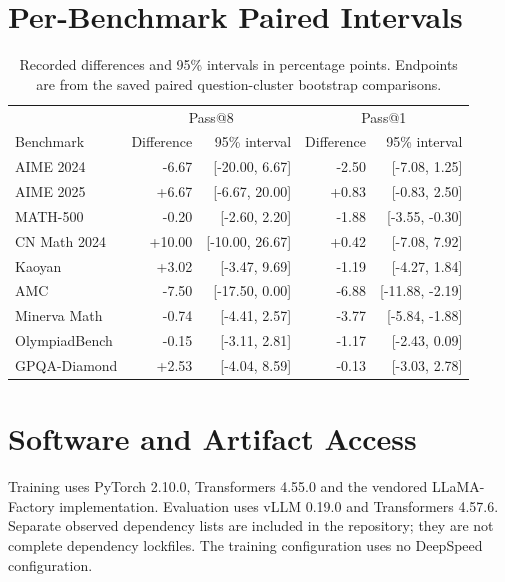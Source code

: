 \documentclass[11pt,letterpaper]{article}
\begin{document}
\appendix
\section{Per-Benchmark Paired Intervals}
\begin{table}[H]\centering\small
\caption{Recorded differences and 95\% intervals in percentage points. Endpoints are from the saved paired question-cluster bootstrap comparisons.}\label{tab:intervals}
\begin{tabular}{lrrrr}\toprule
 & \multicolumn{2}{c}{Pass@8} & \multicolumn{2}{c}{Pass@1}\\
Benchmark & Difference & 95\% interval & Difference & 95\% interval\\\midrule
AIME 2024 & -6.67 & [-20.00, 6.67] & -2.50 & [-7.08, 1.25] \\
AIME 2025 & +6.67 & [-6.67, 20.00] & +0.83 & [-0.83, 2.50] \\
MATH-500 & -0.20 & [-2.60, 2.20] & -1.88 & [-3.55, -0.30] \\
CN Math 2024 & +10.00 & [-10.00, 26.67] & +0.42 & [-7.08, 7.92] \\
Kaoyan & +3.02 & [-3.47, 9.69] & -1.19 & [-4.27, 1.84] \\
AMC & -7.50 & [-17.50, 0.00] & -6.88 & [-11.88, -2.19] \\
Minerva Math & -0.74 & [-4.41, 2.57] & -3.77 & [-5.84, -1.88] \\
OlympiadBench & -0.15 & [-3.11, 2.81] & -1.17 & [-2.43, 0.09] \\
GPQA-Diamond & +2.53 & [-4.04, 8.59] & -0.13 & [-3.03, 2.78] \\
\bottomrule\end{tabular}
\end{table}

\FloatBarrier
\section{Software and Artifact Access}
Training uses PyTorch 2.10.0, Transformers 4.55.0 and the vendored LLaMA-Factory implementation. Evaluation uses vLLM 0.19.0 and Transformers 4.57.6. Separate observed dependency lists are included in the repository; they are not complete dependency lockfiles. The training configuration uses no DeepSpeed configuration.
\end{document}
